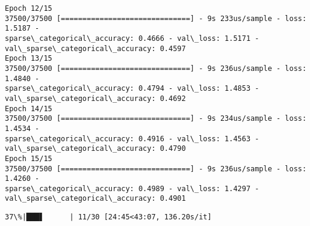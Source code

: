 \documentclass[11pt]{article}
\begin{document}
\begin{Verbatim}[commandchars=\\\{\}]
Epoch 12/15
37500/37500 [==============================] - 9s 233us/sample - loss: 1.5187 -
sparse\_categorical\_accuracy: 0.4666 - val\_loss: 1.5171 -
val\_sparse\_categorical\_accuracy: 0.4597
Epoch 13/15
37500/37500 [==============================] - 9s 236us/sample - loss: 1.4840 -
sparse\_categorical\_accuracy: 0.4794 - val\_loss: 1.4853 -
val\_sparse\_categorical\_accuracy: 0.4692
Epoch 14/15
37500/37500 [==============================] - 9s 234us/sample - loss: 1.4534 -
sparse\_categorical\_accuracy: 0.4916 - val\_loss: 1.4563 -
val\_sparse\_categorical\_accuracy: 0.4790
Epoch 15/15
37500/37500 [==============================] - 9s 236us/sample - loss: 1.4260 -
sparse\_categorical\_accuracy: 0.4989 - val\_loss: 1.4297 -
val\_sparse\_categorical\_accuracy: 0.4901
    \end{Verbatim}

    \begin{Verbatim}[commandchars=\\\{\}]
 37\%|███▋      | 11/30 [24:45<43:07, 136.20s/it]
    \end{Verbatim}
\end{document}
